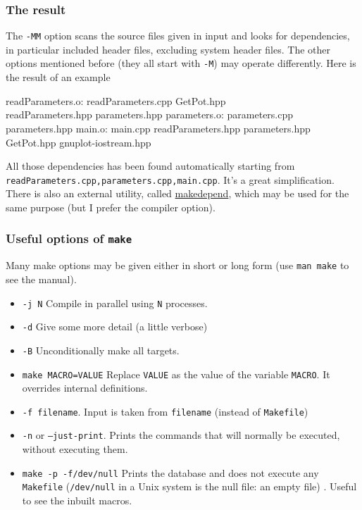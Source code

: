 \documentclass[10pt,aspectratio=169]{beamer}
\begin{document}
\begin{frame}[fragile]
    \frametitle{The result}
    The \texttt{-MM} option scans the source files given in input and looks for dependencies, in particular included header files, \alert{excluding system header files}.  The other options mentioned before (they all start with \texttt{-M}) may operate differently.
    Here is the result of an example
    \begin{semiverbatim}
        readParameters.o: readParameters.cpp GetPot.hpp \\
        readParameters.hpp parameters.hpp
        parameters.o: parameters.cpp parameters.hpp
        main.o: main.cpp readParameters.hpp parameters.hpp \\
        GetPot.hpp gnuplot-iostream.hpp
    \end{semiverbatim}
    All those dependencies has been found automatically starting from
    \texttt{readParameters.cpp,parameters.cpp,main.cpp}. It's a great
    simplification. There is also an external utility, called
    \href{https://linux.die.net/man/1/makedepend}{makedepend}, which may be used for the same purpose (but I
    prefer the compiler option).
\end{frame}

\begin{frame}
    \frametitle{Useful options of \texttt{make}}
    Many make options may be given either in short or long form (use \texttt{man make} to see the manual).
    \begin{itemize}
        \item \texttt{-j N} Compile in parallel using \texttt{N} processes.
        \item \texttt{-d} Give some more detail (a little verbose)
        \item \texttt{-B} Unconditionally make all targets.
        \item \texttt{make MACRO=VALUE} Replace \texttt{VALUE} as the value of the variable
        \texttt{MACRO}. It overrides internal definitions.
        \item \texttt{-f filename}. Input is taken from \texttt{filename} (instead of \texttt{Makefile})
        \item \texttt{-n} or \texttt{--just-print}. Prints the commands 
        that will normally be executed, without executing them.
        \item \texttt{make -p -f/dev/null} Prints the database and does not execute any
        \texttt{Makefile} (\texttt{/dev/null} in a Unix system is the null file: an empty file) . Useful to see the inbuilt macros.
    \end{itemize}
\end{frame}
\end{document}
